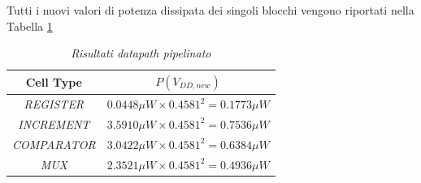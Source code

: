 \noindent Tutti i nuovi valori di potenza dissipata dei singoli blocchi vengono riportati nella Tabella \ref{Tab33_5}
\begin{table}[!h]\footnotesize
	\centering
	\begin{tabular}{|c|c|}
		\hline
		\textbf{Cell Type} & \textbf{$P(V_{DD, new})$} \\
		\hline
		\textit{REGISTER} & $0.0448 \mu W \times 0.4581^{2}=0.1773 \mu W$\\
		\textit{INCREMENT} & $3.5910 \mu W \times 0.4581^{2}=0.7536 \mu W$\\
		\textit{COMPARATOR} & $3.0422 \mu W \times 0.4581^{2}=0.6384 \mu W$\\
		\textit{MUX} &$2.3521 \mu W \times 0.4581^{2}=0.4936\mu W$\\
		\hline
	\end{tabular}
	\caption{\textit{Risultati datapath pipelinato}}
	\label{Tab33_5}
\end{table}


